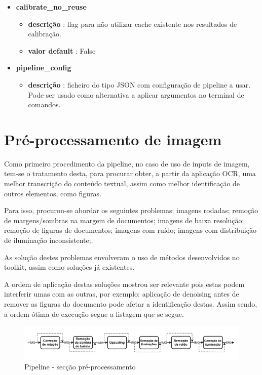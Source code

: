 \begin{itemize}
	\item \textbf{calibrate\_no\_reuse}
		\begin{itemize}\setlength\itemsep{-0.5em}
			\vspace{-1em}
			\item \textbf{descrição} : flag para não utilizar cache existente nos resultados de calibração.
			\item \textbf{valor default} : False
		\end{itemize}
	
	\item \textbf{pipeline\_config}
		\begin{itemize}\setlength\itemsep{-0.5em}
			\vspace{-1em}
			\item \textbf{descrição} : ficheiro do tipo JSON com configuração de pipeline a usar. Pode ser usado como alternativa a aplicar argumentos no terminal de comandos.
		\end{itemize}
\end{itemize}


\section{Pré-processamento de imagem}

Como primeiro procedimento da pipeline, no caso de uso de inputs de imagem, tem-se o tratamento desta, para procurar obter, a partir da aplicação OCR, uma melhor transcrição do conteúdo textual, assim como melhor identificação de outros elementos, como figuras.

Para isso, procurou-se abordar os seguintes problemas: imagens rodadas; remoção de margens/sombras na margem de documentos; imagens de baixa resolução; remoção de figuras de documentos; imagens com ruído; imagens com distribuição de iluminação inconsistente;.

As solução destes problemas envolveram o uso de métodos desenvolvidos no toolkit, assim como soluções já existentes.

A ordem de aplicação destas soluções mostrou ser relevante pois estas podem interferir umas com as outras, por exemplo: aplicação de denoising antes de remover as figuras do documento pode afetar a identificação destas. Assim sendo, a ordem ótima de execução segue a listagem que se segue.

\begin{figure}[H]
	\centering
	\includegraphics[width=1\textwidth]{images/diagramas/arquitetura_pipeline_preprocess.png}
	\caption{Pipeline - secção pré-processamento}
	\label{fig:arquitetura_pipeline_preprocess}
\end{figure}

